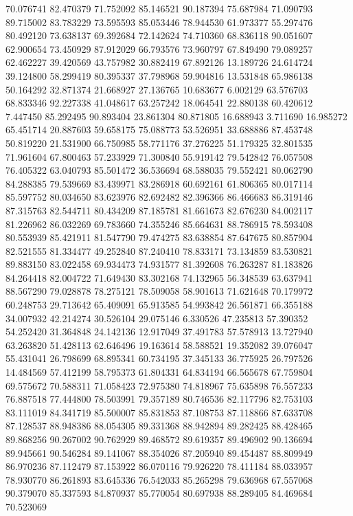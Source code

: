 70.076741
82.470379
71.752092
85.146521
90.187394
75.687984
71.090793
89.715002
83.783229
73.595593
85.053446
78.944530
61.973377
55.297476
80.492120
73.638137
69.392684
72.142624
74.710360
68.836118
90.051607
62.900654
73.450929
87.912029
66.793576
73.960797
67.849490
79.089257
62.462227
39.420569
43.757982
30.882419
67.892126
13.189726
24.614724
39.124800
58.299419
80.395337
37.798968
59.904816
13.531848
65.986138
50.164292
32.871374
21.668927
27.136765
10.683677
6.002129
63.576703
68.833346
92.227338
41.048617
63.257242
18.064541
22.880138
60.420612
7.447450
85.292495
90.893404
23.861304
80.871805
16.688943
3.711690
16.985272
65.451714
20.887603
59.658175
75.088773
53.526951
33.688886
87.453748
50.819220
21.531900
66.750985
58.771176
37.276225
51.179325
32.801535
71.961604
67.800463
57.233929
71.300840
55.919142
79.542842
76.057508
76.405322
63.040793
85.501472
36.536694
68.588035
79.552421
80.062790
84.288385
79.539669
83.439971
83.286918
60.692161
61.806365
80.017114
85.597752
80.034650
83.623976
82.692482
82.396366
86.466683
86.319146
87.315763
82.544711
80.434209
87.185781
81.661673
82.676230
84.002117
81.226962
86.032269
69.783660
74.355246
85.664631
88.786915
78.593408
80.553939
85.421911
81.547790
79.474275
83.638854
87.647675
80.857904
82.521555
81.334477
49.252840
87.240410
78.833171
73.134859
83.530821
89.883150
83.022458
69.934473
74.931577
81.392608
76.263287
81.183826
84.264418
82.004722
71.649430
83.302168
74.132965
56.348539
63.637941
88.567290
79.028878
78.275121
78.509058
58.901613
71.621648
70.179972
60.248753
29.713642
65.409091
65.913585
54.993842
26.561871
66.355188
34.007932
42.214274
30.526104
29.075146
6.330526
47.235813
57.390352
54.252420
31.364848
24.142136
12.917049
37.491783
57.578913
13.727940
63.263820
51.428113
62.646496
19.163614
58.588521
19.352082
39.076047
55.431041
26.798699
68.895341
60.734195
37.345133
36.775925
26.797526
14.484569
57.412199
58.795373
61.804331
64.834194
66.565678
67.759804
69.575672
70.588311
71.058423
72.975380
74.818967
75.635898
76.557233
76.887518
77.444800
78.503991
79.357189
80.746536
82.117796
82.753103
83.111019
84.341719
85.500007
85.831853
87.108753
87.118866
87.633708
87.128537
88.948386
88.054305
89.331368
88.942894
89.282425
88.428465
89.868256
90.267002
90.762929
89.468572
89.619357
89.496902
90.136694
89.945661
90.546284
89.141067
88.354026
87.205940
89.454487
88.809949
86.970236
87.112479
87.153922
86.070116
79.926220
78.411184
88.033957
78.930770
86.261893
83.645336
76.542033
85.265298
79.636968
67.557068
90.379070
85.337593
84.870937
85.770054
80.697938
88.289405
84.469684
70.523069
